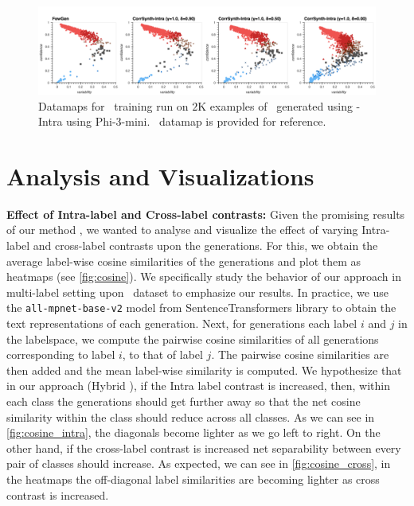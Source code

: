


\begin{figure}[!t]
\centering
\includegraphics[width=\textwidth]{figure/carto_plots_v2.png}
\vspace{-0.5cm}
\caption{Datamaps for \DistilBERT\ training run on $2$K examples of \ToIHeadlines\ generated using \corrsyn-Intra using Phi-3-mini. \fewgen\ datamap is provided for reference.}
\vspace{-1em}
\label{fig:intra-label-carto}
\end{figure}

\section{Analysis and Visualizations}
\label{sec:analysis}

\textbf{Effect of Intra-label and Cross-label contrasts:} Given the promising results of our method \corrsyn, we wanted to analyse and visualize the effect of varying Intra-label and cross-label contrasts upon the generations. For this, we obtain the average label-wise cosine similarities of the generations and plot them as heatmaps (see \autoref{fig:cosine}). We specifically study the behavior of our approach in multi-label setting upon \ToIHeadlines\ dataset to emphasize our results. In practice, we use the \texttt{all-mpnet-base-v2} model from SentenceTransformers library to obtain the text representations of each generation. Next, for generations each label $i$ and $j$ in the labelspace, we compute the pairwise cosine similarities of all generations corresponding to label $i$, to that of label $j$. The pairwise cosine similarities are then added and the mean label-wise similarity is computed. We hypothesize that in our approach (Hybrid \corrsyn), if the Intra label contrast is increased, then, within each class the generations should get further away so that the net cosine similarity within the class should reduce across all classes. As we can see in \autoref{fig:cosine_intra}, the diagonals become lighter as we go left to right. On the other hand, if the cross-label contrast is increased net separability between every pair of classes should increase. As expected, we can see in \autoref{fig:cosine_cross}, in the heatmaps the off-diagonal label similarities are becoming lighter as cross contrast is increased. 





